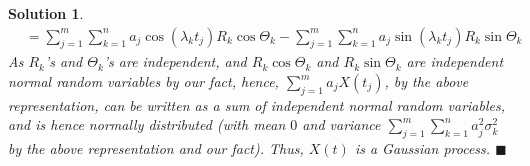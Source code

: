 \documentclass[12pt]{article}
\theoremstyle{problemstyle}
\newtheorem*{solution*}{Solution}
\begin{document}
\begin{solution*}
\begin{align*}
        &= \sum_{j = 1}^m\sum_{k = 1}^n a_j\cos(\lambda_kt_j)R_k\cos\Theta_k - \sum_{j = 1}^m\sum_{k = 1}^n a_j\sin(\lambda_kt_j)R_k\sin\Theta_k
    \end{align*}
    As $R_k$'s and $\Theta_k$'s are independent, and $R_k\cos\Theta_k$ and $R_k\sin\Theta_k$ are independent normal random variables by our fact, hence, $\sum_{j=1}^m a_jX(t_j)$, by the above representation, can be written as a sum of independent normal random variables, and is hence normally distributed (with mean $0$ and variance $\sum_{j = 1}^m\sum_{k=1}^n a_j^2\sigma_k^2$ by the above representation and our fact). Thus, $X(t)$ is a Gaussian process. \hfill $\blacksquare$
    
    
    
    
    
    
\end{solution*}

\newpage

\end{document}
